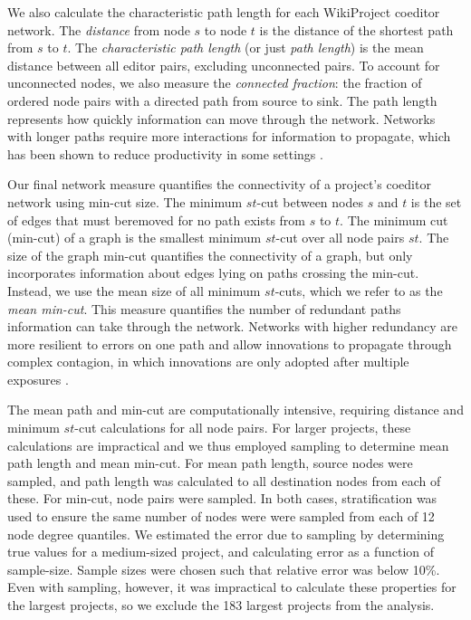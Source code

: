 We also calculate the characteristic path length for each WikiProject coeditor network.
The {\em distance} from node $s$ to node $t$ is the distance of the shortest path
from $s$ to $t$.
The {\em characteristic path length} (or just {\em path length})
is the mean distance between all editor pairs,
excluding unconnected pairs.
To account for unconnected nodes, we also measure the {\em connected fraction}:
the fraction of ordered node pairs with a directed path from source to sink.
The path length represents how quickly information can move through the network.
Networks with longer paths require more interactions for information to propagate,
which has been shown to reduce productivity in some settings
\cite{mason_propagation_2008,barkoczi_social_2016}.

Our final network measure quantifies the connectivity of a project's coeditor
network using min-cut size.
The minimum $st$-cut between nodes $s$ and $t$ is the set of edges that must beremoved
for no path exists from $s$ to $t$.
The minimum cut (min-cut) of a graph is the smallest minimum $st$-cut over all node pairs $st$. 
The size of the graph min-cut quantifies the connectivity of a graph,
but only incorporates information about edges lying on paths crossing the min-cut.
Instead, we use the mean size of all minimum $st$-cuts, which we refer to as the
{\em mean min-cut}.
This measure quantifies the number of redundant paths information can take through the network.
Networks with higher redundancy are more resilient to errors on one path \cite{albert_error_2000}
and allow innovations to propagate through complex contagion,
in which innovations are only adopted after multiple exposures \cite{centola_complex_2007}.

The mean path and min-cut are computationally intensive,
requiring distance and minimum $st$-cut calculations for all node pairs.
For larger projects, these calculations are impractical and we thus employed
sampling to determine mean path length and mean min-cut.
For mean path length, source nodes were sampled, and path length was calculated to all destination nodes
from each of these.
For min-cut, node pairs were sampled.
In both cases, stratification was used to ensure the same number of nodes were were sampled from each of
12 node degree quantiles.
We estimated the error due to sampling by determining true values for a medium-sized project,
and calculating error as a function of sample-size.
Sample sizes were chosen such that relative error was below 10\%.
Even with sampling, however, it was impractical to calculate these properties for the largest projects,
so we exclude the 183 largest projects from the analysis.

